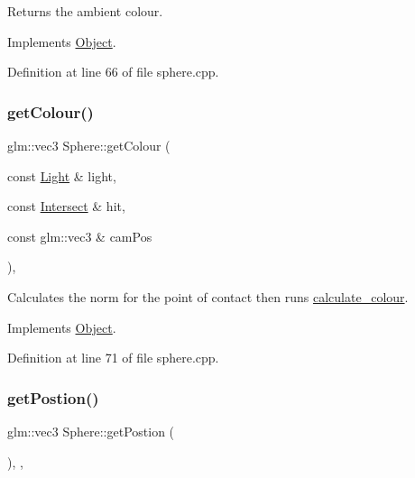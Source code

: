 Returns the ambient colour. 



Implements \mbox{\hyperlink{class_object_a0a966fb37be861cbaacb834ef7b89d8a}{Object}}.



Definition at line 66 of file sphere.\+cpp.

\mbox{\label{class_sphere_a0ce51c06baaea1c35129b17b5132ff58}} 
\subsubsection{\texorpdfstring{get\+Colour()}{getColour()}\hspace{0.1cm}{\footnotesize\ttfamily [2/2]}}
{\footnotesize\ttfamily glm\+::vec3 Sphere\+::get\+Colour (\begin{DoxyParamCaption}\item[{const \mbox{\hyperlink{class_light}{Light}} \&}]{light,  }\item[{const \mbox{\hyperlink{struct_intersect}{Intersect}} \&}]{hit,  }\item[{const glm\+::vec3 \&}]{cam\+Pos }\end{DoxyParamCaption})\hspace{0.3cm}{\ttfamily [override]}, {\ttfamily [virtual]}}



Calculates the norm for the point of contact then runs \mbox{\hyperlink{util_8h_ae9aaa22b1b1c0249f8617f45eb99ad55}{calculate\+\_\+colour}}. 



Implements \mbox{\hyperlink{class_object_aac162b545913d7aeab851204d3f04ebf}{Object}}.



Definition at line 71 of file sphere.\+cpp.

\mbox{\label{class_sphere_a6e2f290f9632e8da3d8dd90dc74997ac}} 
\subsubsection{\texorpdfstring{get\+Postion()}{getPostion()}}
{\footnotesize\ttfamily glm\+::vec3 Sphere\+::get\+Postion (\begin{DoxyParamCaption}{ }\end{DoxyParamCaption})\hspace{0.3cm}{\ttfamily [inline]}, {\ttfamily [override]}, {\ttfamily [virtual]}}



